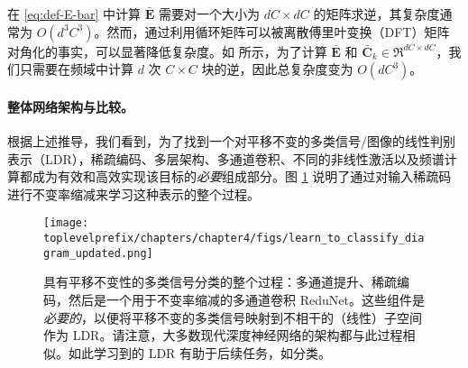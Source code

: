 \documentclass[../../book-main.tex]{subfiles}
\begin{document}
\begin{remark}[在频域中降低计算复杂性]
在 \eqref{eq:def-E-bar} 中计算 $\bar{\bm E}$ 需要对一个大小为 $dC \times dC$ 的矩阵求逆，其复杂度通常为 $O(d^3C^3)$。然而，通过利用循环矩阵可以被离散傅里叶变换（DFT）矩阵对角化的事实，可以显著降低复杂度。如 \cite{chan2021redunet} 所示，为了计算 $\bar{\bm E}$ 和 $\bar{\bm C}_k \in \Re^{dC \times dC}$，我们只需要在频域中计算 $d$ 次 $C\times C$ 块的逆，因此总复杂度变为 $O(dC^3)$。

\end{remark}




\paragraph{整体网络架构与比较。}
根据上述推导，我们看到，为了找到一个对平移不变的多类信号/图像的线性判别表示（LDR），稀疏编码、多层架构、多通道卷积、不同的非线性激活以及频谱计算都成为有效和高效实现该目标的{\em 必要}组成部分。图 \ref{fig:learn-to-classify-diagram} 说明了通过对输入稀疏码进行不变率缩减来学习这种表示的整个过程。

\begin{figure}[t]
    \centering
    \texttt{[image: \\toplevelprefix/chapters/chapter4/figs/learn\_to\_classify\_diagram\_updated.png]}
    \caption{具有平移不变性的多类信号分类的整个过程：多通道提升、稀疏编码，然后是一个用于不变率缩减的多通道卷积 ReduNet。这些组件是{\em 必要的}，以便将平移不变的多类信号映射到不相干的（线性）子空间作为 LDR。请注意，大多数现代深度神经网络的架构都与此过程相似。如此学习到的 LDR 有助于后续任务，如分类。}
    \label{fig:learn-to-classify-diagram}
\end{figure}

\end{document}
